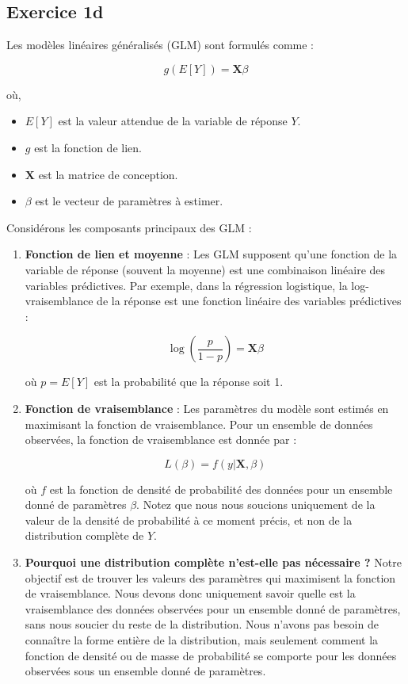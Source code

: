 \documentclass[../main.tex]{subfiles}
\begin{document}
\begin{CJK*}{UTF8}{gbsn}

\section*{Exercice 1d}

Les modèles linéaires généralisés (GLM) sont formulés comme :

\[ g(E[Y]) = \mathbf{X}\beta \]

où,
\begin{itemize}
    \item \( E[Y] \) est la valeur attendue de la variable de réponse \( Y \).
    \item \( g \) est la fonction de lien.
    \item \( \mathbf{X} \) est la matrice de conception.
    \item \( \beta \) est le vecteur de paramètres à estimer.
\end{itemize}

Considérons les composants principaux des GLM :

\begin{enumerate}
    \item \textbf{Fonction de lien et moyenne} :
Les GLM supposent qu'une fonction de la variable de réponse (souvent la moyenne) 
est une combinaison linéaire des variables prédictives. Par exemple, dans la régression logistique, 
la log-vraisemblance de la réponse est une fonction linéaire des variables prédictives :

\[ \log\left(\frac{p}{1-p}\right) = \mathbf{X}\beta \]

où \( p = E[Y] \) est la probabilité que la réponse soit 1.

    \item \textbf{Fonction de vraisemblance} :
Les paramètres du modèle sont estimés en maximisant la fonction de vraisemblance. 
Pour un ensemble de données observées, la fonction de vraisemblance est donnée par :

\[ L(\beta) = f(y | \mathbf{X}, \beta) \]

où \( f \) est la fonction de densité de probabilité des données pour un ensemble 
donné de paramètres \( \beta \). Notez que nous nous soucions uniquement de la valeur 
de la densité de probabilité à ce moment précis, et non de la distribution complète de \( Y \).

    \item \textbf{Pourquoi une distribution complète n'est-elle pas nécessaire ?}
Notre objectif est de trouver les valeurs des paramètres qui maximisent la fonction de vraisemblance. 
Nous devons donc uniquement savoir quelle est la vraisemblance des 
données observées pour un ensemble donné de paramètres, sans nous soucier du reste de la distribution. 
Nous n'avons pas besoin de connaître la forme entière de la distribution, mais seulement comment 
la fonction de densité ou de masse de probabilité se comporte pour 
les données observées sous un ensemble donné de paramètres.


\end{enumerate}
\end{CJK*}
\end{document}
